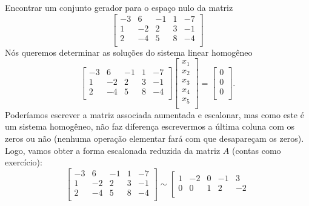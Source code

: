 \documentclass[../livro.tex]{subfiles}  %
\begin{document}
\begin{example}
	Encontrar um conjunto gerador para o espaço nulo da matriz
	\begin{equation}
	\left[
	\begin{array}{ccccc}
	-3 & 6  & -1 & 1 & -7 \\
	1  & -2 & 2  & 3 & -1 \\
	2  & -4 & 5  & 8 & -4 \\
	\end{array}
	\right]
	\end{equation} Nós queremos determinar as soluções do sistema linear homogêneo
	\begin{equation}
	\left[
	\begin{array}{ccccc}
	-3 & 6  & -1 & 1 & -7 \\
	1  & -2 & 2  & 3 & -1 \\
	2  & -4 & 5  & 8 & -4 \\
	\end{array}
	\right]
	\left[
	\begin{array}{c}
	x_1 \\
	x_2 \\
	x_3 \\
	x_4 \\
	x_5 \\
	\end{array}
	\right] = 
	\left[
	\begin{array}{c}
	0 \\
	0 \\
	0 \\
	\end{array}
	\right].
	\end{equation} Poderíamos escrever a matriz associada aumentada e escalonar, mas como este é um sistema homogêneo, não faz diferença escrevermos a última coluna com os zeros ou não (nenhuma operação elementar fará com que desapareçam os zeros). Logo, vamos obter a forma escalonada reduzida da matriz $A$ (contas como exercício):
	\begin{equation}
	\left[
	\begin{array}{ccccc}
	-3 & 6  & -1 & 1 & -7 \\
	1  & -2 & 2  & 3 & -1 \\
	2  & -4 & 5  & 8 & -4 \\
	\end{array}
	\right] \sim 
	\left[
	\begin{array}{ccccc}
	1 & -2 & 0  & -1 & 3  \\
	0 & 0  & 1  & 2  & -2 \\

\end{array}
\end{equation}
\end{example}
\end{document}
